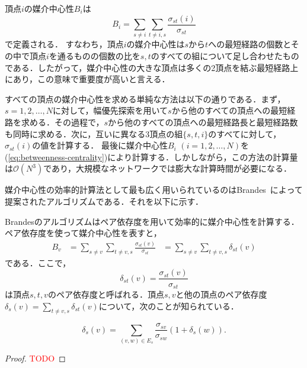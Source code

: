 頂点$i$の媒介中心性$B_i$は
\begin{equation}
  B_i=\sum_{s\neq i}\sum_{t\neq {i,s}}\frac{\sigma_{st}(i)}{\sigma_{st}}
  \label{eq:betweenness-centrality}
\end{equation}
で定義される\cite{Freeman1977}．
すなわち，頂点$i$の媒介中心性は$s$から$t$への最短経路の個数とその中で頂点$i$を通るものの個数の比を$s,t$のすべての組について足し合わせたものである．したがって，媒介中心性の大きな頂点は多くの2頂点を結ぶ最短経路上にあり，この意味で重要度が高いと言える．

すべての頂点の媒介中心性を求める単純な方法は以下の通りである．まず，$s=1,2,\ldots,N$に対して，幅優先探索を用いて$s$から他のすべての頂点への最短経路を求める．その過程で，$s$から他のすべての頂点への最短経路長と最短経路数も同時に求める．次に，互いに異なる3頂点の組$\{s,t,i\}$のすべてに対して，$\sigma_{st}(i)$の値を計算する．
最後に媒介中心性$B_i$ $(i=1,2,\ldots,N)$を(\ref{eq:betweenness-centrality})により計算する．しかしながら，この方法の計算量は$\mathcal{O}(N^3)$であり，大規模なネットワークでは膨大な計算時間が必要になる．

媒介中心性の効率的計算法として最も広く用いられているのはBrandes~\cite{Brandes2001}によって提案されたアルゴリズムである．それを以下に示す．

Brandesのアルゴリズムはペア依存度を用いて効率的に媒介中心性を計算する．
ペア依存度を使って媒介中心性を表すと，
\begin{equation*}
  \begin{aligned}
    B_v&=\sum_{s\neq v}\sum_{t\neq v,s}\frac{\sigma_{st}(v)}{\sigma_{st}}
    &=\sum_{s\neq v}\sum_{t\neq v,s}\delta_{st}(v)
  \end{aligned}
\end{equation*}
である．ここで，
\begin{equation*}
  \label{eq:def-pairwise-dependency}
  \delta_{st}(v)=\frac{\sigma_{st}(v)}{\sigma_{st}}
\end{equation*}
は頂点$s,t,v$のペア依存度と呼ばれる．頂点$s,v$と他の頂点のペア依存度$\delta_{s}(v)=\sum_{t\neq v,s}\delta_{st}(v)$について，次のことが知られている．

\begin{theorem}
  \label{th:implicit-pairwise-dependency}
  \begin{equation*}
    \delta_{s}(v)=\sum_{(v,w)\in E_s}\frac{\sigma_{sv}}{\sigma_{sw}}(1+\delta_{s}(w)).
  \end{equation*}
\end{theorem}
\begin{proof}
  \textcolor{red}{TODO}
\end{proof}

